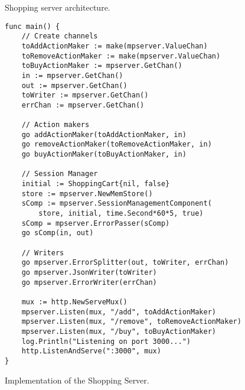 \documentclass[12pt,a4paper]{article}
\begin{document}
\begin{figure}[h]
\centering
{}
\caption[scale=1.0]{Shopping server architecture.}
\label{fig:shoppingDesign}
\end{figure}

\newpage
\begin{figure}[h]
\begin{lstlisting}
func main() {
    // Create channels
    toAddActionMaker := make(mpserver.ValueChan)
    toRemoveActionMaker := make(mpserver.ValueChan)
    toBuyActionMaker := mpserver.GetChan()
    in := mpserver.GetChan()
    out := mpserver.GetChan()
    toWriter := mpserver.GetChan()
    errChan := mpserver.GetChan()

    // Action makers
    go addActionMaker(toAddActionMaker, in)
    go removeActionMaker(toRemoveActionMaker, in)
    go buyActionMaker(toBuyActionMaker, in)

    // Session Manager
    initial := ShoppingCart{nil, false}
    store := mpserver.NewMemStore()
    sComp := mpserver.SessionManagementComponent(
        store, initial, time.Second*60*5, true)
    sComp = mpserver.ErrorPasser(sComp)
    go sComp(in, out)

    // Writers
    go mpserver.ErrorSplitter(out, toWriter, errChan)
    go mpserver.JsonWriter(toWriter)
    go mpserver.ErrorWriter(errChan)

    mux := http.NewServeMux()
    mpserver.Listen(mux, "/add", toAddActionMaker)
    mpserver.Listen(mux, "/remove", toRemoveActionMaker)
    mpserver.Listen(mux, "/buy", toBuyActionMaker)
    log.Println("Listening on port 3000...")
    http.ListenAndServe(":3000", mux)
}
\end{lstlisting}
\caption[scale=1.0]{Implementation of the Shopping Server.}
\label{fig:shoppingCode}
\end{figure}
\end{document}
